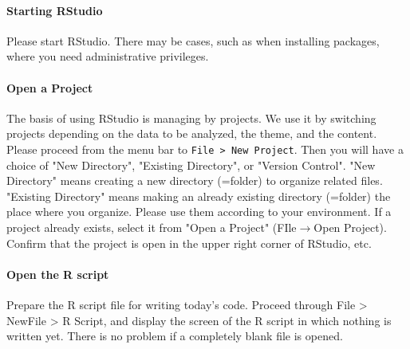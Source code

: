 \documentclass{ltjsbook}
\begin{document}
\paragraph{Starting RStudio} Please start RStudio. There may be cases, such as when installing packages, where you need administrative privileges.
\paragraph{Open a Project}\label{UnderProject}The basis of using RStudio is managing by projects. We use it by switching projects depending on the data to be analyzed, the theme, and the content. Please proceed from the menu bar to \verb|File > New Project|. Then you will have a choice of "New Directory", "Existing Directory", or "Version Control". "New Directory" means creating a new directory (=folder) to organize related files. "Existing Directory" means making an already existing directory (=folder) the place where you organize. Please use them according to your environment. If a project already exists, select it from "Open a Project" (FIle$\to$Open Project). Confirm that the project is open in the upper right corner of RStudio, etc.
\paragraph{Open the R script} Prepare the R script file for writing today's code. Proceed through File > NewFile > R Script, and display the screen of the R script in which nothing is written yet. There is no problem if a completely blank file is opened.
\end{document}
